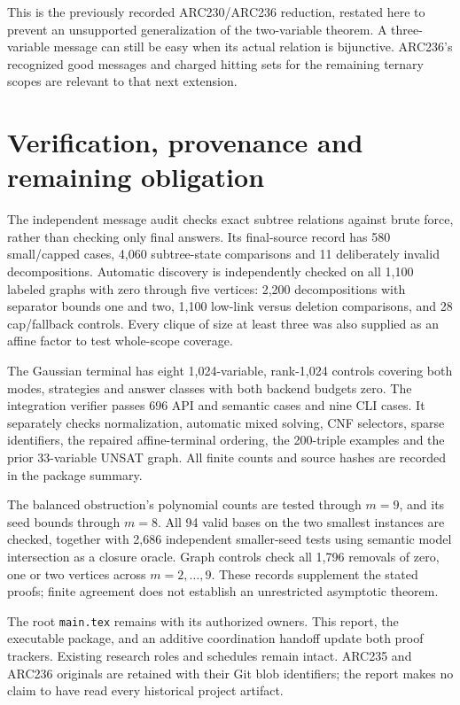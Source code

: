 \documentclass[11pt]{article}
\begin{document}
This is the previously recorded ARC230/ARC236 reduction, restated here to
prevent an unsupported generalization of the two-variable theorem. A
three-variable message can still be easy when its actual relation is
bijunctive. ARC236's recognized good messages and charged hitting sets for
the remaining ternary scopes are relevant to that next extension.

\section{Verification, provenance and remaining obligation}
The independent message audit checks exact subtree relations against brute
force, rather than checking only final answers. Its final-source record has
580 small/capped cases, 4,060 subtree-state comparisons and 11 deliberately
invalid decompositions. Automatic discovery is independently checked on all
1,100 labeled graphs with zero through five vertices: 2,200 decompositions
with separator bounds one and two, 1,100 low-link versus deletion comparisons,
and 28 cap/fallback controls. Every clique of size at least three was also
supplied as an affine factor to test whole-scope coverage.

The Gaussian terminal has eight 1,024-variable, rank-1,024 controls covering
both modes, strategies and answer classes with both backend budgets zero.
The integration verifier passes 696 API and semantic cases and nine CLI
cases. It separately checks normalization, automatic mixed
solving, CNF selectors, sparse identifiers, the repaired affine-terminal
ordering, the 200-triple examples and the prior 33-variable UNSAT graph.
All finite counts and source hashes are recorded in the package summary.

The balanced obstruction's polynomial counts are tested through \(m=9\),
and its seed bounds through \(m=8\). All 94 valid bases on the two smallest
instances are checked, together with 2,686 independent smaller-seed tests
using semantic model intersection as a closure oracle. Graph controls check
all 1,796 removals of zero, one or two vertices across \(m=2,\ldots,9\).
These records supplement the stated proofs; finite agreement does not
establish an unrestricted asymptotic theorem.

The root \texttt{main.tex} remains with its authorized owners. This report,
the executable package, and an additive coordination handoff update both
proof trackers. Existing research roles and schedules remain intact.
ARC235 and ARC236 originals are retained with their Git blob identifiers;
the report makes no claim to have read every historical project artifact.
\end{document}
